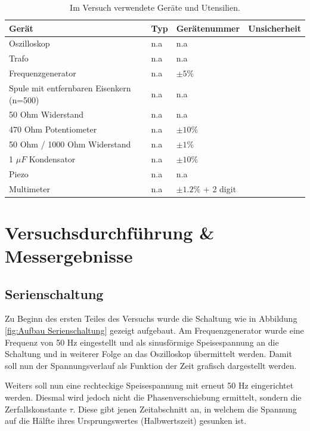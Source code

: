 \documentclass[12pt,a4paper,twoside]{article}
\begin{document}
    \begin{table}[H]
        \centering
        \caption{Im Versuch verwendete Geräte und Utensilien.}
        \label{tab:geraete}
        \begin{tabular}{| l | l | l | l |}
            \hline
            Gerät   & Typ   & Gerätenummer  & Unsicherheit \\
            \hline
            Oszilloskop & {n.a} & {n.a} \\
            Trafo & {n.a} & {n.a} \\
            Frequenzgenerator & {n.a} & $\pm 5\%$ \\
            Spule mit entfernbaren Eisenkern (n=500) & {n.a} & {n.a} \\
            50 Ohm Widerstand & {n.a} & {n.a} \\
            470 Ohm Potentiometer & {n.a} & $\pm 10\%$ \\
            50 Ohm / 1000 Ohm Widerstand & {n.a} & $\pm 1\%$ \\
            1 $\mu F$ Kondensator& {n.a} & $\pm 10\%$ \\
            Piezo & {n.a} & {n.a} \\
            Multimeter & {n.a} & $\pm 1.2\%$ + 2 digit \\
            \hline
        \end{tabular}
    \end{table}


\section{Versuchsdurchführung \& Messergebnisse} %

\subsection{Serienschaltung}

Zu Beginn des ersten Teiles des Versuchs wurde die Schaltung wie in Abbildung \ref{fig:Aufbau Serienschaltung} gezeigt aufgebaut. 
Am Frequenzgenerator wurde eine Frequenz von 50 Hz eingestellt und als sinusförmige Speisespannung an die Schaltung und in weiterer Folge an das Oszilloskop übermittelt werden. Damit soll nun der Spannungsverlauf als Funktion der Zeit grafisch dargestellt werden. \newline

\noindent
Weiters soll nun eine rechteckige Speisespannung mit erneut 50 Hz eingerichtet werden. Diesmal wird jedoch nicht die Phasenverschiebung ermittelt, sondern die Zerfallskonstante $\tau$.
Diese gibt jenen Zeitabschnitt an, in welchem die Spannung auf die Hälfte ihres Ursprungswertes (Halbwertszeit) gesunken ist. \newline
\end{document}

